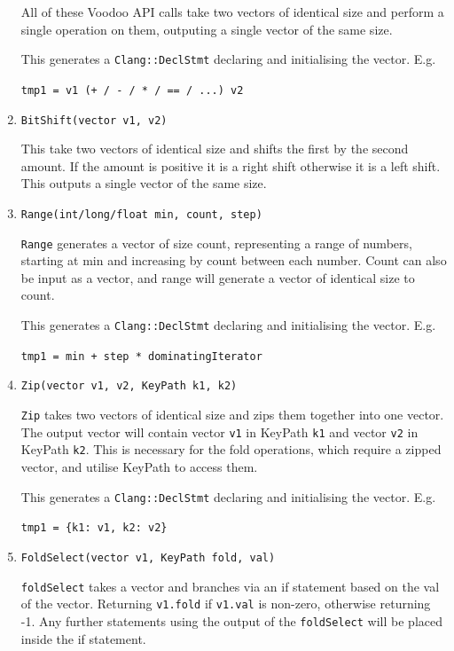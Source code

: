 \begin{enumerate}
All of these Voodoo API calls take two vectors of identical size and perform a single operation on them, outputing a single vector of the same size. 

This generates a \texttt{Clang::DeclStmt} declaring and initialising the vector. E.g.

{\centering\texttt{tmp1 = v1 (+ / - / * / == / ...) v2}\par}

\item \texttt{BitShift(vector v1, v2)}

This take two vectors of identical size and shifts the first by the second amount. If the amount is positive it is a right shift otherwise it is a left shift. This outputs a single vector of the same size.

\item \texttt{Range(int/long/float min, count, step)}

\texttt{Range} generates a vector of size count, representing a range of numbers, starting at min and increasing by count between each number. Count can also be input as a vector, and range will generate a vector of identical size to count. 

This generates a \texttt{Clang::DeclStmt} declaring and initialising the vector. E.g.

{\centering\texttt{tmp1 = min + step * dominatingIterator}\par}

\item \texttt{Zip(vector v1, v2, KeyPath k1, k2)}

\texttt{Zip} takes two vectors of identical size and zips them together into one vector. The output vector will contain vector \texttt{v1} in KeyPath \texttt{k1} and vector \texttt{v2} in KeyPath \texttt{k2}. This is necessary for the fold operations, which require a zipped vector, and utilise KeyPath to access them.

This generates a \texttt{Clang::DeclStmt} declaring and initialising the vector. E.g.

{\centering\texttt{tmp1 = \{{k1: v1, k2: v2\}}}\par}

\item \texttt{FoldSelect(vector v1, KeyPath fold, val)}

\texttt{foldSelect} takes a vector and branches via an if statement based on the val of the vector. Returning \texttt{v1.fold} if \texttt{v1.val} is non-zero, otherwise returning -1. Any further statements using the output of the \texttt{foldSelect} will be placed inside the if statement.


\end{enumerate}
